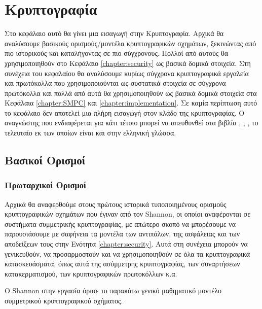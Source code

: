 \chapter{Κρυπτογραφία}
\label{chapter:cryptography}

Στο κεφάλαιο αυτό θα γίνει μια εισαγωγή στην Κρυπτογραφία. Αρχικά θα αναλύσουμε βασικούς ορισμούς/μοντέλα κρυπτογραφικών σχημάτων, ξεκινώντας από πιο ιστορικούς και καταλήγοντας σε πιο σύγχρονους. Πολλοί από αυτούς θα χρησιμοποιηθούν στο Κεφάλαιο \ref{chapter:security} ως βασικά δομικά στοιχεία. Στη συνέχεια του κεφαλαίου θα αναλύσουμε κυρίως σύγχρονα κρυπτογραφικά εργαλεία και πρωτόκολλα που χρησιμοποιούνται ως συστατικά στοιχεία σε σύγχρονα πρωτόκολλα και πολλά από αυτά θα χρησιμοποιηθούν ως βασικά δομικά στοιχεία στα Κεφάλαια \ref{chapter:SMPC} και \ref{chapter:implementation}. Σε καμία περίπτωση αυτό το κεφάλαιο δεν αποτελεί μια πλήρη εισαγωγή στον κλάδο της κρυπτογραφίας. Ο αναγνώστης που ενδιαφέρεται για κάτι τέτοιο μπορεί να απευθυνθεί στα βιβλία \cite{boneh2020graduate}, \cite{hoffstein2008introduction}, \cite{pagourtzis2016computational}, το τελευταίο εκ των οποίων είναι και στην ελληνική γλώσσα.

\section{Βασικοί Ορισμοί}

\subsection{Πρωταρχικοί Ορισμοί}

Αρχικά θα αναφερθούμε στους πρώτους ιστορικά τυποποιημένους ορισμούς κρυπτογραφικών σχημάτων που έγιναν από τον Shannon, οι οποίοι αναφέρονται σε συστήματα συμμετρικής κρυπτογραφίας, με απώτερο σκοπό να μπορέσουμε να παρουσιάσουμε με σαφήνεια τα μοντέλα των αντιπάλων, της ασφάλειας και των αποδείξεων τους στην Ενότητα \ref{chapter:security}. Αυτά στη συνέχεια μπορούν να γενικευθούν, να προσαρμοστούν και να χρησιμοποιηθούν σε όλα τα κρυπτογραφικά κατασκευάσματα, όπως αυτά της ασύμμετρης κρυπτογραφίας, των συναρτήσεων κατακερματισμού, των κρυπτογραφικών πρωτοκόλλων κ.α.

Ο Shannon στην εργασία \cite{shannon1945mathematical} όρισε το παρακάτω γενικό μαθηματικό μοντέλο συμμετρικού κρυπτογραφικού σχήματος.

